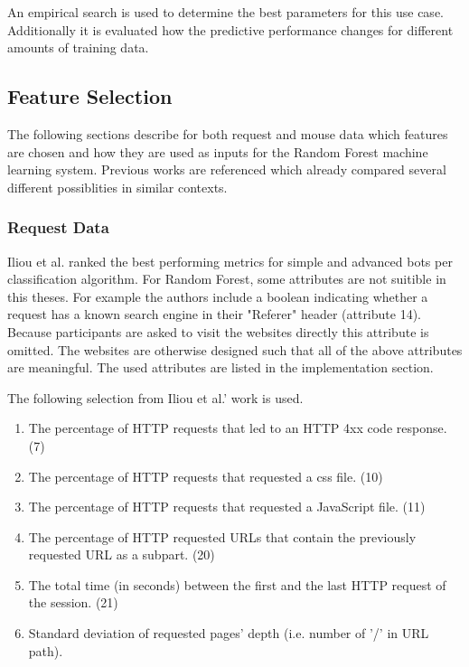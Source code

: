 \documentclass[
    fontsize=12pt,
    headings=small,
    parskip=half,           %
    bibliography=totoc,
    numbers=noenddot,       %
    open=any,               %
    final                   %
]{scrreprt}
\begin{document}
An empirical search is used to determine the best parameters for this use case. Additionally it is evaluated how the predictive performance changes for different amounts of training data.

\subsection{Feature Selection}

The following sections describe for both request and mouse data which features are chosen and how they are used as inputs for the Random Forest machine learning system. Previous works are referenced which already compared several different possiblities in similar contexts.

\subsubsection{Request Data}

Iliou et al. \cite{10.1145/3339252.3339267} ranked the best performing metrics for simple and advanced bots per classification algorithm. For Random Forest, some attributes are not suitible in this theses. For example the authors include a boolean indicating whether a request has a known search engine in their "Referer" header (attribute 14). Because participants are asked to visit the websites directly this attribute is omitted. The websites are otherwise designed such that all of the above attributes are meaningful. The used attributes are listed in the implementation section.

The following selection from Iliou et al.' work \cite{10.1145/3339252.3339267} is used.

\begin{enumerate}
	\item The percentage of HTTP requests that led to an HTTP 4xx code response. (7)
	\item The percentage of HTTP requests that requested a css file. (10)
	\item The percentage of HTTP requests that requested a JavaScript file. (11)
	\item The percentage of HTTP requested URLs that contain the previously requested URL as a subpart. (20)
	\item The total time (in seconds) between the first and the last HTTP request of the session. (21)
	\item Standard deviation of requested pages' depth (i.e. number of ’/’ in URL path).
\end{enumerate}
\end{document}
